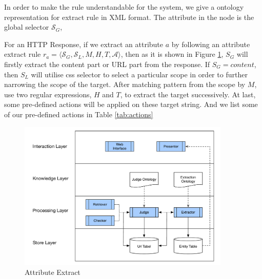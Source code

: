 In order to make the rule understandable for the system, we give a ontology representation for extract rule in XML format. The  attribute in the  node is the global selector $\mathcal{S}_G$,
\vspace{1em}


For an HTTP Response, if we extract an attribute $a$ by following an attribute extract rule $r_a=\langle \mathcal{S}_G, \mathcal{S}_L, M, H, T, \mathcal{A} \rangle$, then as it is shown in Figure \ref{fig:attribute_ext}, $S_G$ will firstly extract the content part or URL part from the response. If $S_G = content$, then $S_L$ will utilise css selector to select a particular scope in order to further narrowing the scope of the target. After matching pattern from the scope by $M$, use two regular expressions, $H$ and $T$, to extract the target successively. At last, some pre-defined actions will be applied on these target string. And we list some of our pre-defined actions in Table \ref{tab:actions}
\begin{figure}[htb!]
	\centering
	\includegraphics[page=10,width=0.9\textwidth]{images/diagrams.pdf}
	\caption{Attribute Extract}\label{fig:attribute_ext}
\end{figure}

